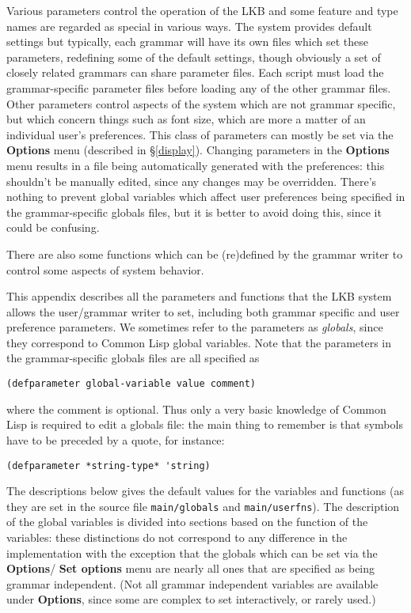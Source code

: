 \documentclass[12pt]{report}
\newcommand{\filename}[1]{{\tt #1}}
\newcommand{\lkbmenucommand}{\bf}
\newcommand{\newterm}[1]{{\it #1}}
\begin{document}
Various parameters control the operation of the LKB and some feature and
type names are regarded as special in various ways.
The system provides default settings
but typically, each grammar will have its own files which set these
parameters, redefining some of the default settings, though
obviously a set of closely related grammars can share parameter
files.  Each script must load the grammar-specific parameter files
before loading any of the other grammar files.
Other parameters control aspects of the system which
are not grammar specific, but which concern things such as 
font size, which are more a matter of an individual user's preferences.
This class of parameters can mostly be set via the {\lkbmenucommand Options}
menu (described in \S\ref{display}).
Changing parameters in the {\lkbmenucommand Options} menu results in
a file being automatically generated with the preferences:
this shouldn't be manually edited, since any changes may be 
overridden.  There's nothing to prevent global variables which affect
user preferences being specified in the grammar-specific globals
files, but it is better to avoid doing this, since it could be confusing.

There are also some functions which can be (re)defined
by the grammar writer to control some aspects of system behavior.

This appendix describes all the parameters and functions
that the LKB system allows the
user/grammar writer to set, including both grammar specific and
user preference parameters.
We sometimes refer to the parameters as \newterm{globals}, since they
correspond to Common Lisp global variables. 
Note that the parameters in the grammar-specific globals files are 
all specified as
\begin{verbatim}
(defparameter global-variable value comment)
\end{verbatim}
where the comment is optional.
Thus only a very basic knowledge of Common Lisp is required to
edit a globals file: the main thing to remember is that symbols
have to be preceded by a quote, for instance:
\begin{verbatim}
(defparameter *string-type* 'string)
\end{verbatim}

The descriptions below gives the
default values for the variables and functions
(as they are set in the source file
\filename{main/globals} and \filename{main/userfns}). 
The description of the global variables is divided into sections
based on the function of the variables: these 
distinctions do not correspond to any difference in the implementation
with the exception that the globals which can be set via the
{\lkbmenucommand Options}/ {\lkbmenucommand Set options}
menu are nearly all ones that are specified as being
grammar independent.  (Not all grammar independent variables
are available under {\lkbmenucommand Options}, since some are complex to set
interactively, or rarely used.)
\end{document}
